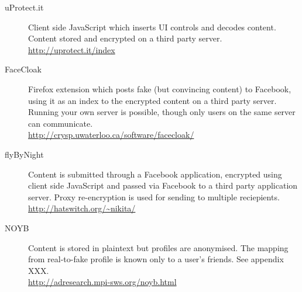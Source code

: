     \begin{description}
    
        \item[uProtect.it] Client side JavaScript which inserts UI controls and decodes content. Content stored and encrypted on a third party server. \hfill \\
        \url{http://uprotect.it/index}
        
        \item[FaceCloak] Firefox extension which posts fake (but convincing content) to Facebook, using it as an index to the encrypted content on a third party server. Running your own server is possible, though only users on the same server can communicate. \hfill \\
        \url{http://crysp.uwaterloo.ca/software/facecloak/}
        
        \item[flyByNight] Content is submitted through a Facebook application, encrypted using client side JavaScript and passed via Facebook to a third party application server. Proxy re-encryption is used for sending to multiple reciepients. \hfill \\
        \url{http://hatswitch.org/~nikita/}
        
        \item[NOYB] Content is stored in plaintext but profiles are anonymised. The mapping from real-to-fake profile is known only to a user's friends. See appendix XXX. \hfill \\
        \url{http://adresearch.mpi-sws.org/noyb.html}
        
    \end{description}





